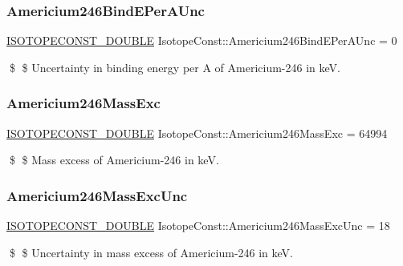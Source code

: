 \subsubsection{\texorpdfstring{Americium246\+Bind\+E\+Per\+A\+Unc}{Americium246BindEPerAUnc}}
{\footnotesize\ttfamily \mbox{\hyperlink{group___isotope_const-_macros_ga8f45a7272ce02c0b4c65c44636ed719a}{I\+S\+O\+T\+O\+P\+E\+C\+O\+N\+S\+T\+\_\+\+D\+O\+U\+B\+LE}} Isotope\+Const\+::\+Americium246\+Bind\+E\+Per\+A\+Unc = 0}

\$ \$ Uncertainty in binding energy per A of Americium-\/246 in keV. \mbox{\label{group___isotope_const-_americium-_am246_ga2fe5a19c84a86fb4c310b5b45e3341c1}} 
\subsubsection{\texorpdfstring{Americium246\+Mass\+Exc}{Americium246MassExc}}
{\footnotesize\ttfamily \mbox{\hyperlink{group___isotope_const-_macros_ga8f45a7272ce02c0b4c65c44636ed719a}{I\+S\+O\+T\+O\+P\+E\+C\+O\+N\+S\+T\+\_\+\+D\+O\+U\+B\+LE}} Isotope\+Const\+::\+Americium246\+Mass\+Exc = 64994}

\$ \$ Mass excess of Americium-\/246 in keV. \mbox{\label{group___isotope_const-_americium-_am246_gada6c463e61cbb71c5a9e264f38a3c0e1}} 
\subsubsection{\texorpdfstring{Americium246\+Mass\+Exc\+Unc}{Americium246MassExcUnc}}
{\footnotesize\ttfamily \mbox{\hyperlink{group___isotope_const-_macros_ga8f45a7272ce02c0b4c65c44636ed719a}{I\+S\+O\+T\+O\+P\+E\+C\+O\+N\+S\+T\+\_\+\+D\+O\+U\+B\+LE}} Isotope\+Const\+::\+Americium246\+Mass\+Exc\+Unc = 18}

\$ \$ Uncertainty in mass excess of Americium-\/246 in keV. \mbox{\label{group___isotope_const-_americium-_am246_gacc1a3f2bda3001cd23dad5acf1e08290}} 
